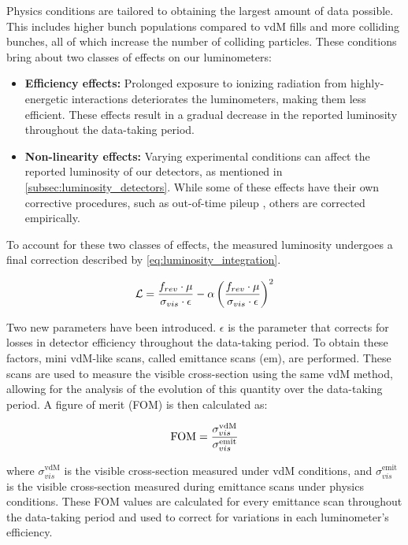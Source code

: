 {Physics conditions are tailored to obtaining the largest amount of data possible. This includes higher bunch populations compared to vdM fills and more colliding bunches, all of which increase the number of colliding particles. These conditions bring about two classes of effects on our luminometers:

\begin{itemize}
    \item \textbf{Efficiency effects:} Prolonged exposure to ionizing radiation from highly-energetic interactions deteriorates the luminometers, making them less efficient. These effects result in a gradual decrease in the reported luminosity throughout the data-taking period.
    \item \textbf{Non-linearity effects:} Varying experimental conditions can affect the reported luminosity of our detectors, as mentioned in \autoref{subsec:luminosity_detectors}. While some of these effects have their own corrective procedures, such as out-of-time pileup \cite{Sirunyan:2759951}, others are corrected empirically.
\end{itemize}

To account for these two classes of effects, the measured luminosity undergoes a final correction described by \autoref{eq:luminosity_integration}.

\begin{equation}
    \centering
    \mathcal{L} = \frac{f_{rev} \cdot \mu}{\sigma_{vis} \cdot \epsilon} - \alpha \left( \frac{f_{rev} \cdot \mu}{\sigma_{vis} \cdot \epsilon} \right)^{2}
    \label{eq:luminosity_integration}
\end{equation}

Two new parameters have been introduced. \(\epsilon\) is the parameter that corrects for losses in detector efficiency throughout the data-taking period. To obtain these factors, mini vdM-like scans, called emittance scans (em), are performed. These scans are used to measure the visible cross-section using the same vdM method, allowing for the analysis of the evolution of this quantity over the data-taking period. A figure of merit (FOM) is then calculated as:

\begin{equation}
    \centering
    \text{FOM} = \frac{\sigma^{\text{vdM}}_{vis}}{\sigma^{\text{emit}}_{vis}}
    \label{eq:figure_of_merit}
\end{equation}

where \(\sigma^{\text{vdM}}_{vis}\) is the visible cross-section measured under vdM conditions, and \(\sigma^{\text{emit}}_{vis}\) is the visible cross-section measured during emittance scans under physics conditions. These FOM values are calculated for every emittance scan throughout the data-taking period and used to correct for variations in each luminometer's efficiency.

}
